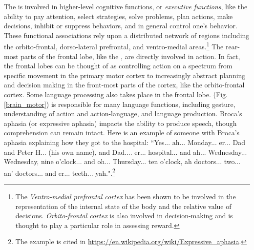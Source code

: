 The  is involved in higher-level cognitive functions, or \emph{executive functions}, like the ability to pay attention, select strategies, solve problems, plan actions, make decisions, inhibit or suppress behaviors, and in general control one's behavior. These functional associations rely upon a distributed network of regions including the orbito-frontal, dorso-lateral prefrontal, and ventro-medial areas.\footnote{The \emph{Ventro-medial prefrontal cortex} has been shown to be involved in the representation of the internal state of the body and the relative value of decisions. \emph{Orbito-frontal cortex} is also involved in decision-making and is thought to play a particular role in assessing reward.} The rear-most parts of the frontal lobe, like the , are directly involved in action. In fact, the frontal lobes can be thought of as controlling action on a spectrum from specific movement in the primary motor cortex to  increasingly abstract planning and decision making in the front-most parts of the cortex, like the orbito-frontal cortex. Some language processing also takes place in the frontal lobe.  (Fig. \ref{brain_motor}) is responsible for many language functions, including gesture, understanding of action and action-language, and language production. Broca's aphasia (or expressive aphasia) impacts the ability to produce speech, though comprehension can remain intact. Here is an example of someone with Broca's aphasia explaining how they got to the hospital: ``Yes... ah... Monday... er... Dad and Peter H... (his own name), and Dad.... er... hospital... and ah... Wednesday... Wednesday, nine o'clock... and oh... Thursday... ten o'clock, ah doctors... two... an' doctors... and er... teeth... yah."\cite{goodglass1976language}.\footnote{The example is cited in \url{https://en.wikipedia.org/wiki/Expressive_aphasia}.}


